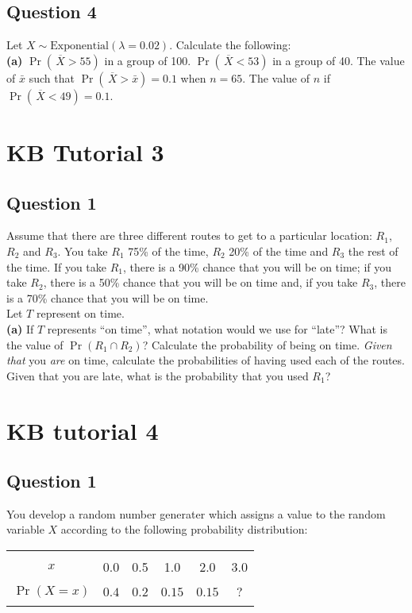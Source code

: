 \subsection*{Question 4}
Let $X \sim \text{Exponential}(\lambda=0.02)$. Calculate the following:\\[-0.2cm]

{\bf(a)} $\Pr(\,\overline{\!X} > 55)$ in a group of 100.  $\Pr(\,\overline{\!X} < 53)$ in a group of 40.  The value of $\bar x$ such that $\Pr(\,\overline{\!X} > \bar x) = 0.1$ when $n=65$.  The value of $n$ if $\Pr(\,\overline{\!X} < 49) = 0.1$.



\section{KB Tutorial 3}
\subsection*{Question 1}
Assume that there are three different routes to get to a particular location: $R_1$, $R_2$ and $R_3$. You take $R_1$ 75\% of the time, $R_2$ 20\% of the time and $R_3$ the rest of the time. If you take $R_1$, there is a 90\% chance that you will be on time; if you take $R_2$, there is a 50\% chance that you will be on time and, if you take $R_3$, there is a 70\% chance that you will be on time. \\[0.1cm]
Let $T$ represent on time.\\[-0.2cm]

{\bf(a)} If $T$ represents ``on time'', what notation would we use for ``late''?  What is the value of $\Pr(R_1 \cap R_2)$?  Calculate the probability of being on time.  \emph{Given that} you \emph{are} on time, calculate the probabilities of having used each of the routes.  Given that you are late, what is the probability that you used $R_1$?






\section{KB tutorial 4}

\subsection*{Question 1}
You develop a random number generater which assigns a value to the random variable $X$ according to the following probability distribution:
\begin{center}
	\begin{tabular}{|c|ccccc|}
		\hline
		&&&&&\\[-0.4cm]
		$x$ & 0.0 & 0.5 & 1.0 & 2.0 & 3.0 \\
		\hline
		&&&&&\\[-0.4cm]
		$\Pr(X=x)$ & $0.4$ & $0.2$ & $0.15$ & $0.15$ & $?$ \\[0.1cm]
		\hline
		\multicolumn{6}{c}{}\\
	\end{tabular}
\end{center}

